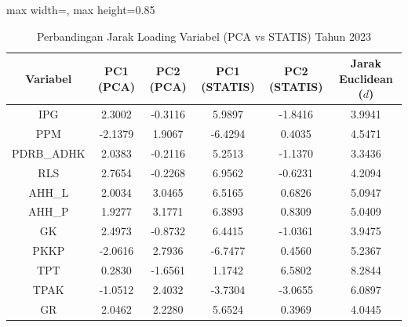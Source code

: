 \begin{table}[H]
\centering
\caption{Perbandingan Jarak Loading Variabel (PCA vs STATIS) Tahun 2023} \label{tab:app1jarak_loading_2023}
\begin{adjustbox}{max width=\textwidth, max height=0.85\textheight}
\begin{tabular}{|c|c|c|c|c|c|}
\hline
\textbf{Variabel} & \textbf{PC1 (PCA)} & \textbf{PC2 (PCA)} & \textbf{PC1 (STATIS)} & \textbf{PC2 (STATIS)} & \textbf{Jarak Euclidean ($d$)} \\
\hline
IPG & 2.3002 & -0.3116 & 5.9897 & -1.8416 & 3.9941 \\
PPM & -2.1379 & 1.9067 & -6.4294 & 0.4035 & 4.5471 \\
PDRB\_ADHK & 2.0383 & -0.2116 & 5.2513 & -1.1370 & 3.3436 \\
RLS & 2.7654 & -0.2268 & 6.9562 & -0.6231 & 4.2094 \\
AHH\_L & 2.0034 & 3.0465 & 6.5165 & 0.6826 & 5.0947 \\
AHH\_P & 1.9277 & 3.1771 & 6.3893 & 0.8309 & 5.0409 \\
GK & 2.4973 & -0.8732 & 6.4415 & -1.0361 & 3.9475 \\
PKKP & -2.0616 & 2.7936 & -6.7477 & 0.4560 & 5.2367 \\
TPT & 0.2830 & -1.6561 & 1.1742 & 6.5802 & 8.2844 \\
TPAK & -1.0512 & 2.4032 & -3.7304 & -3.0655 & 6.0897 \\
GR & 2.0462 & 2.2280 & 5.6524 & 0.3969 & 4.0445 \\
\hline
\end{tabular}
\end{adjustbox}
\end{table}